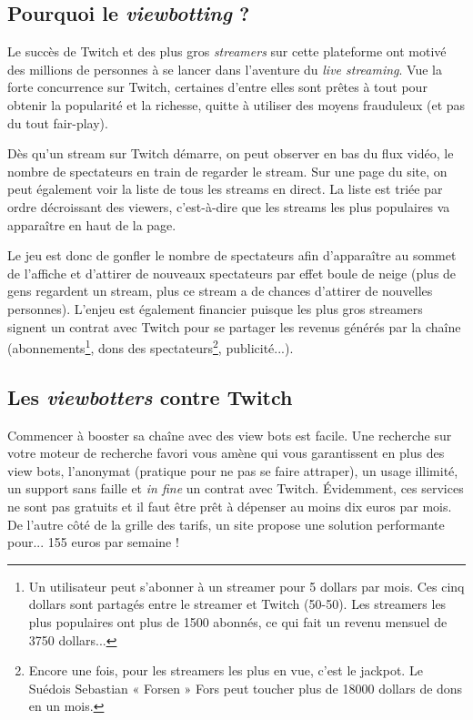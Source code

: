 \documentclass[a4paper]{article}
\begin{document}
\subsection{Pourquoi le \textit{viewbotting} ?}

Le succès de Twitch et des plus gros \textit{streamers} sur cette plateforme ont motivé des millions de personnes à se lancer dans l'aventure du \textit{live streaming}. Vue la forte concurrence sur Twitch, certaines d'entre elles sont prêtes à tout pour obtenir la popularité et la richesse, quitte à utiliser des moyens frauduleux (et pas du tout fair-play).

Dès qu'un stream sur Twitch démarre, on peut observer en bas du flux vidéo, le nombre de spectateurs en train de regarder le stream. Sur une page du site, on peut également voir la liste de tous les streams en direct. La liste est triée par ordre décroissant des viewers, c'est-à-dire que les streams les plus populaires va apparaître en haut de la page.


Le jeu est donc de gonfler le nombre de spectateurs afin d'apparaître au sommet de l'affiche et d'attirer de nouveaux spectateurs par effet boule de neige (plus de gens regardent un stream, plus ce stream a de chances d'attirer de nouvelles personnes). L'enjeu est également financier puisque les plus gros streamers signent un contrat avec Twitch pour se partager les revenus générés par la chaîne (abonnements\footnote{Un utilisateur peut s'abonner à un streamer pour 5 dollars par mois. Ces cinq dollars sont partagés entre le streamer et Twitch (50-50). Les streamers les plus populaires ont plus de 1500 abonnés, ce qui fait un revenu mensuel de 3750 dollars...}, dons des spectateurs\footnote{Encore une fois, pour les streamers les plus en vue, c'est le jackpot. Le Suédois Sebastian « Forsen » Fors peut toucher plus de 18000 dollars de dons en un mois.}, publicité...).

\subsection{Les \textit{viewbotters} contre Twitch}

Commencer à booster sa chaîne avec des view bots est facile. Une recherche sur votre moteur de recherche favori vous amène qui vous garantissent en plus des view bots, l'anonymat (pratique pour ne pas se faire attraper), un usage illimité, un support sans faille et \textit{in fine} un contrat avec Twitch. Évidemment, ces services ne sont pas gratuits et il faut être prêt à dépenser au moins dix euros par mois. De l'autre côté de la grille des tarifs, un site propose une solution performante pour... 155 euros par semaine ! 
\end{document}
